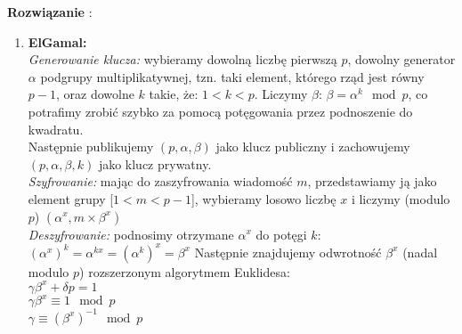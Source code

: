 \documentclass[a4paper,10pt, twocolumn]{article}
\begin{document}
\textbf{Rozwiązanie} : 
\begin{enumerate}
 \item \textbf{ElGamal:}
  \\\emph{Generowanie klucza:} wybieramy dowolną liczbę pierwszą $p$, dowolny generator $\alpha$ podgrupy multiplikatywnej, tzn. taki element, którego rząd jest równy $p-1$, oraz dowolne $k$ takie, że: $1 < k < p$. Liczymy $\beta$:
  $\beta = \alpha^k \mod p$,
  co potrafimy zrobić szybko za pomocą potęgowania przez podnoszenie do kwadratu.
  \\Następnie publikujemy $(p, \alpha, \beta)$ jako klucz publiczny i zachowujemy $(p, \alpha, \beta, k)$ jako klucz prywatny.
  \\\emph{Szyfrowanie:} mając do zaszyfrowania wiadomość $m$, przedstawiamy ją jako element grupy [$1 < m < p - 1 $], wybieramy losowo liczbę $x$ i liczymy (modulo $p$)
  $(\alpha^x, m\times \beta^x)$
  \\\emph{Deszyfrowanie:} podnosimy otrzymane $\alpha^x$ do potęgi $k$:
  $\left(\alpha^x\right)^k = \alpha^{kx} = \left(\alpha^k\right)^x = \beta^x$
  Następnie znajdujemy odwrotność $\beta^x$ (nadal modulo $p$) rozszerzonym algorytmem Euklidesa:
  \\$\gamma \beta^x + \delta p = 1$
  \\$\gamma \beta^x \equiv 1 \mod p$
  \\$\gamma \equiv (\beta^x)^{-1} \mod p$


\end{enumerate}
\end{document}
